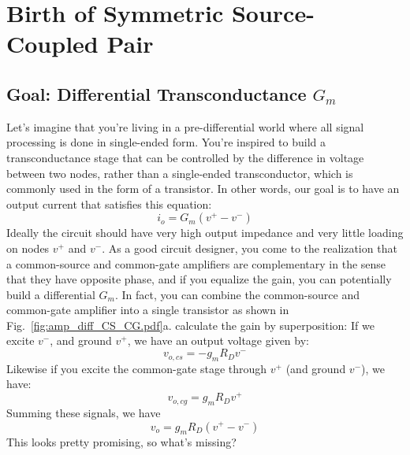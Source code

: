 \section{Birth of Symmetric Source-Coupled Pair}
\subsection{Goal:  Differential Transconductance \texorpdfstring{$G_m$}{}}
Let's imagine that you're living in a pre-differential world where all signal processing is done in single-ended form.  You're inspired to build a transconductance stage that can be controlled by the difference in voltage between two nodes, rather than a single-ended transconductor, which is commonly used in the form of a transistor.   In other words, our goal is to have an output current that satisfies this equation:
    \begin{equation}
        i_o = G_m (v^+ - v^-)
    \end{equation}
Ideally the circuit should have very high output impedance and very little loading on nodes $v^+$ and $v^-$.  As a good circuit designer, you come to the realization that a common-source and common-gate amplifiers are complementary in the sense that they have opposite phase, and if you equalize the gain, you can potentially build a differential $G_m$.  In fact, you can combine the common-source and common-gate amplifier into a single transistor as shown in Fig.~\ref{fig:amp_diff_CS_CG.pdf}a.  
calculate the gain by superposition:  If we excite $v^-$, and ground $v^+$, we have an output voltage given by:
    \begin{equation}
        v_{o,cs} = -g_m R_D v^-
    \end{equation} 
Likewise if you excite the common-gate stage through $v^+$ (and ground $v^-$), we have:
    \begin{equation}
        v_{o,cg} = g_m R_D  v^+
    \end{equation} 
Summing these signals, we have
    \begin{equation}
        v_o =   g_m R_D  (v^+ - v^- )
    \end{equation}
This looks pretty promising, so what's missing? 
